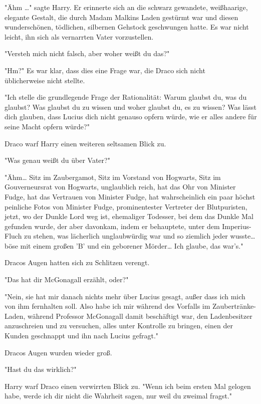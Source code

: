 {"Ähm …" sagte Harry. Er erinnerte sich an die schwarz gewandete, weißhaarige, elegante Gestalt, die durch Madam Malkins Laden gestürmt war und diesen wunderschönen, tödlichen, silbernen Gehstock geschwungen hatte. Es war nicht leicht, ihn sich als vernarrten Vater vorzustellen.

"Versteh mich nicht falsch, aber woher weißt du das?"

"Hm?" Es war klar, dass dies eine Frage war, die Draco sich nicht\\ üblicherweise nicht stellte.

"Ich stelle die grundlegende Frage der Rationalität: Warum glaubst du, was du glaubst? Was glaubst du zu wissen und woher glaubst du, es zu wissen? Was lässt dich glauben, dass Lucius dich nicht genauso opfern würde, wie er alles andere für seine Macht opfern würde?"

Draco warf Harry einen weiteren seltsamen Blick zu.

"Was genau weißt du über Vater?"

"Ähm… Sitz im Zaubergamot, Sitz im Vorstand von Hogwarts, Sitz im Gouverneursrat von Hogwarts, unglaublich reich, hat das Ohr von Minister Fudge, hat das Vertrauen von Minister Fudge, hat wahrscheinlich ein paar höchst peinliche Fotos von Minister Fudge, prominentester Vertreter der Blutpuristen, jetzt, wo der Dunkle Lord weg ist, ehemaliger Todesser, bei dem das Dunkle Mal gefunden wurde, der aber davonkam, indem er behauptete, unter dem Imperius-Fluch zu stehen, was lächerlich unglaubwürdig war und so ziemlich jeder wusste… böse mit einem großen 'B' und ein geborener Mörder… Ich glaube, das war's."

Dracos Augen hatten sich zu Schlitzen verengt.

"Das hat dir McGonagall erzählt, oder?"

"Nein, sie hat mir danach nichts mehr über Lucius gesagt, außer dass ich mich von ihm fernhalten soll. Also habe ich mir während des Vorfalls im Zaubertränke-Laden, während Professor McGonagall damit beschäftigt war, den Ladenbesitzer anzuschreien und zu versuchen, alles unter Kontrolle zu bringen, einen der Kunden geschnappt und ihn nach Lucius gefragt."

Dracos Augen wurden wieder groß.

"Hast du das wirklich?"

Harry warf Draco einen verwirrten Blick zu. "Wenn ich beim ersten Mal gelogen habe, werde ich dir nicht die Wahrheit sagen, nur weil du zweimal fragst."

}
